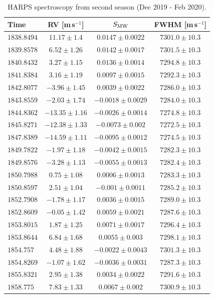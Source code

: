 \documentclass[fleqn,usenatbib]{mnras}
\newcommand{\harps}{{HARPS}}
\newcommand{\ms}{m\,s$^{-1}$}
\begin{document}
\begin{table}
\caption{\harps{} spectroscopy from second season (Dec 2019 - Feb 2020).}
\label{tab:spec2}
\small
\begin{tabular}{lccc}
\hline
\hline
Time & RV [\ms{}] & $S_{\rm MW}$ & FWHM [\ms{}] \\
\hline
\hline
$1838.8494$ & $11.17\pm1.4$ & $0.0147\pm0.0022$ & $7301.0\pm10.3$ \\
$1839.8578$ & $6.52\pm1.26$ & $0.0142\pm0.0017$ & $7301.5\pm10.3$ \\
$1840.8432$ & $3.27\pm1.15$ & $0.0136\pm0.0014$ & $7294.8\pm10.3$ \\
$1841.8384$ & $3.16\pm1.19$ & $0.0097\pm0.0015$ & $7292.3\pm10.3$ \\
$1842.8077$ & $-3.96\pm1.45$ & $0.0039\pm0.0022$ & $7286.0\pm10.3$ \\
$1843.8559$ & $-2.03\pm1.74$ & $-0.0018\pm0.0029$ & $7284.0\pm10.3$ \\
$1844.8362$ & $-13.35\pm1.16$ & $-0.0026\pm0.0014$ & $7274.8\pm10.3$ \\
$1845.8271$ & $-12.38\pm1.33$ & $-0.0073\pm0.002$ & $7272.5\pm10.3$ \\
$1847.8389$ & $-14.59\pm1.11$ & $-0.0095\pm0.0012$ & $7274.5\pm10.3$ \\
$1849.7822$ & $-1.97\pm1.18$ & $-0.0042\pm0.0015$ & $7282.3\pm10.3$ \\
$1849.8576$ & $-3.28\pm1.13$ & $-0.0055\pm0.0013$ & $7282.4\pm10.3$ \\
$1850.7988$ & $0.75\pm1.08$ & $0.0006\pm0.0013$ & $7283.3\pm10.3$ \\
$1850.8597$ & $2.51\pm1.04$ & $-0.001\pm0.0011$ & $7285.2\pm10.3$ \\
$1852.7908$ & $-1.78\pm1.17$ & $0.0036\pm0.0015$ & $7289.0\pm10.3$ \\
$1852.8609$ & $-0.05\pm1.42$ & $0.0059\pm0.0021$ & $7287.6\pm10.3$ \\
$1853.8015$ & $1.87\pm1.25$ & $0.0071\pm0.0017$ & $7296.4\pm10.3$ \\
$1853.8644$ & $6.84\pm1.68$ & $0.0055\pm0.003$ & $7298.1\pm10.3$ \\
$1854.757$ & $4.48\pm1.88$ & $-0.0022\pm0.0043$ & $7301.3\pm10.3$ \\
$1854.8269$ & $-1.07\pm1.62$ & $-0.0036\pm0.0031$ & $7287.3\pm10.3$ \\
$1855.8321$ & $2.95\pm1.38$ & $0.0034\pm0.0022$ & $7291.6\pm10.3$ \\
$1858.775$ & $7.83\pm1.33$ & $0.0067\pm0.002$ & $7300.9\pm10.3$ \\

\end{tabular}
\end{table}
\end{document}
